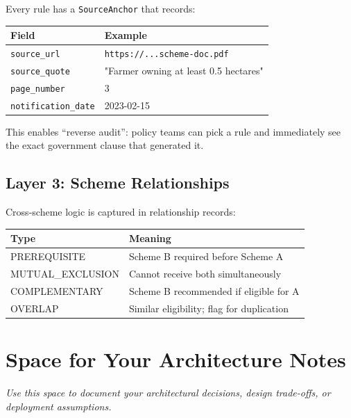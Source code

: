 \documentclass[11pt,a4paper]{report}
\newcommand{\inlinecode}[1]{\texttt{\color{secondary}#1}}
\newenvironment{notebox}{%
  \begin{callout}%
}{%
  \end{callout}%
}
\begin{document}
Every rule has a \inlinecode{SourceAnchor} that records:

\begin{table}[H]
\centering
\small
\begin{tabular}{lp{5cm}}
\toprule
Field & Example \\
\midrule
\inlinecode{source\_url} & \texttt{https://...scheme-doc.pdf} \\
\inlinecode{source\_quote} & "Farmer owning at least 0.5 hectares" \\
\inlinecode{page\_number} & 3 \\
\inlinecode{notification\_date} & 2023-02-15 \\
\bottomrule
\end{tabular}
\end{table}

This enables ``reverse audit'': policy teams can pick a rule and immediately see the exact government clause that generated it.

\subsection{Layer 3: Scheme Relationships}

Cross-scheme logic is captured in relationship records:

\begin{table}[H]
\centering
\small
\begin{tabular}{lp{5cm}}
\toprule
Type & Meaning \\
\midrule
PREREQUISITE & Scheme B required before Scheme A \\
MUTUAL\_EXCLUSION & Cannot receive both simultaneously \\
COMPLEMENTARY & Scheme B recommended if eligible for A \\
OVERLAP & Similar eligibility; flag for duplication \\
\bottomrule
\end{tabular}
\end{table}

\section{Space for Your Architecture Notes}

\begin{notebox}
\Large\vspace{2.5cm}

\noindent\textcolor{dark}{\emph{Use this space to document your architectural decisions, design trade-offs, or deployment assumptions.}}

\vspace{2.5cm}
\end{notebox}
\end{document}
